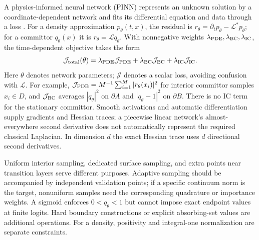 \documentclass[12pt,a4paper,oneside]{book}
\begin{document}
A physics-informed neural network (PINN) represents an unknown solution by a coordinate-dependent network and fits
its differential equation and data through a loss \cite{raissi2017pinn}. For a density approximation $p_\theta(t,x)$,
the residual is $r_\theta=\partial_t p_\theta-\mathcal L^*p_\theta$; for a committor $q_\theta(x)$ it is
$r_\theta=\mathcal Lq_\theta$. With nonnegative weights $\lambda_{\rm PDE},\lambda_{\rm BC},\lambda_{\rm IC}$,
the time-dependent objective takes the form
\begin{equation*}
 \mathcal J_{\rm total}(\theta)=\lambda_{\rm PDE}\mathcal J_{\rm PDE}
 +\lambda_{\rm BC}\mathcal J_{\rm BC}+\lambda_{\rm IC}\mathcal J_{\rm IC}.
\end{equation*}
Here $\theta$ denotes network parameters; $\mathcal J$ denotes a scalar loss, avoiding confusion with $\mathcal L$.
For example, $\mathcal J_{\rm PDE}=M^{-1}\sum_{i=1}^M|r_\theta(x_i)|^2$ for interior committor samples $x_i\in D$,
and $\mathcal J_{\rm BC}$ averages $|q_\theta|^2$ on $\partial A$ and $|q_\theta-1|^2$ on $\partial B$.
There is no IC term for the stationary committor. Smooth activations and automatic differentiation supply gradients
and Hessian traces; a piecewise linear network's almost-everywhere second derivative does not automatically represent
the required classical Laplacian. In dimension $d$ the exact Hessian trace uses $d$ directional second derivatives.

Uniform interior sampling, dedicated surface sampling, and extra points near transition layers serve different purposes.
Adaptive sampling should be accompanied by independent validation points; if a specific continuum norm is the target,
nonuniform samples need the corresponding quadrature or importance weights. A sigmoid enforces $0<q_\theta<1$ but
cannot impose exact endpoint values at finite logits. Hard boundary constructions or explicit absorbing-set values are
additional operations. For a density, positivity and integral-one normalization are separate constraints.
\end{document}
